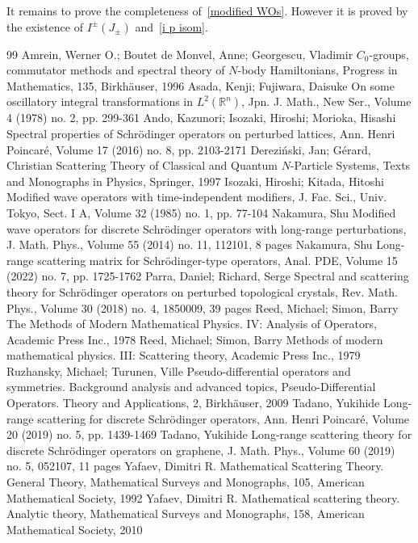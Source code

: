 \documentclass[10pt,a4paper]{amsart}
\begin{document}
It remains to prove the completeness of~\eqref{modified WOs}. However it is proved by the existence of $I^\pm(J_\pm)$ and~\eqref{i p isom}.

\begin{thebibliography}{99}
 Amrein, Werner O.; Boutet de Monvel, Anne; Georgescu, Vladimir ${C}_0$-groups, commutator methods and spectral theory of ${N}$-body Hamiltonians, Progress in Mathematics, 135, Birkhäuser, 1996
 Asada, Kenji; Fujiwara, Daisuke On some oscillatory integral transformations in ${L}^2(\mathbb{R}^n)$, Jpn. J. Math., New Ser., Volume 4 (1978) no. 2, pp. 299-361
 Ando, Kazunori; Isozaki, Hiroshi; Morioka, Hisashi Spectral properties of Schrödinger operators on perturbed lattices, Ann. Henri Poincaré, Volume 17 (2016) no. 8, pp. 2103-2171
 Dereziński, Jan; Gérard, Christian Scattering Theory of Classical and Quantum ${N}$-Particle Systems, Texts and Monographs in Physics, Springer, 1997
 Isozaki, Hiroshi; Kitada, Hitoshi Modified wave operators with time-independent modifiers, J. Fac. Sci., Univ. Tokyo, Sect. I A, Volume 32 (1985) no. 1, pp. 77-104
 Nakamura, Shu Modified wave operators for discrete Schrödinger operators with long-range perturbations, J. Math. Phys., Volume 55 (2014) no. 11, 112101, 8 pages
 Nakamura, Shu Long-range scattering matrix for Schrödinger-type operators, Anal. PDE, Volume 15 (2022) no. 7, pp. 1725-1762
 Parra, Daniel; Richard, Serge Spectral and scattering theory for Schrödinger operators on perturbed topological crystals, Rev. Math. Phys., Volume 30 (2018) no. 4, 1850009, 39 pages
 Reed, Michael; Simon, Barry The Methods of Modern Mathematical Physics. IV: Analysis of Operators, Academic Press Inc., 1978
 Reed, Michael; Simon, Barry Methods of modern mathematical physics. III: Scattering theory, Academic Press Inc., 1979
 Ruzhansky, Michael; Turunen, Ville Pseudo-differential operators and symmetries. Background analysis and advanced topics, Pseudo-Differential Operators. Theory and Applications, 2, Birkhäuser, 2009
 Tadano, Yukihide Long-range scattering for discrete Schrödinger operators, Ann. Henri Poincaré, Volume 20 (2019) no. 5, pp. 1439-1469
 Tadano, Yukihide Long-range scattering theory for discrete Schrödinger operators on graphene, J. Math. Phys., Volume 60 (2019) no. 5, 052107, 11 pages
 Yafaev, Dimitri R. Mathematical Scattering Theory. General Theory, Mathematical Surveys and Monographs, 105, American Mathematical Society, 1992
 Yafaev, Dimitri R. Mathematical scattering theory. Analytic theory, Mathematical Surveys and Monographs, 158, American Mathematical Society, 2010
\end{thebibliography}
\end{document}

